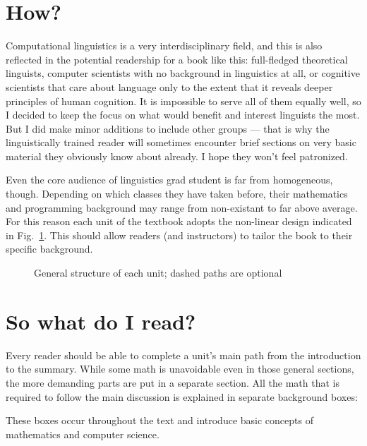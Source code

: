 \section*{How?}

Computational linguistics is a very interdisciplinary field, and this is also reflected in the potential readership for a book like this: full-fledged theoretical linguists, computer scientists with no background in linguistics at all, or cognitive scientists that care about language only to the extent that it reveals deeper principles of human cognition.
It is impossible to serve all of them equally well, so I decided to keep the focus on what would benefit and interest linguists the most.
But I did make minor additions to include other groups --- that is why the linguistically trained reader will sometimes encounter brief sections on very basic material they obviously know about already.
I hope they won't feel patronized.

Even the core audience of linguistics grad student is far from homogeneous, though.
Depending on which classes they have taken before, their mathematics and programming background may range from non-existant to far above average.
For this reason each unit of the textbook adopts the non-linear design indicated in Fig.~\ref{fig:preface_generalstructure}.
This should allow readers (and instructors) to tailor the book to their specific background.

\begin{figure}
    \centering
\caption{General structure of each unit; dashed paths are optional}
\label{fig:preface_generalstructure}
\end{figure}

\section*{So what do I read?}

Every reader should be able to complete a unit's main path from the introduction to the summary.
While some math is unavoidable even in those general sections, the more demanding parts are put in a separate section.
All the math that is required to follow the main discussion is explained in separate background boxes:

\begin{techinfo}
These boxes occur throughout the text and introduce basic concepts of mathematics and computer science.
\end{techinfo}

